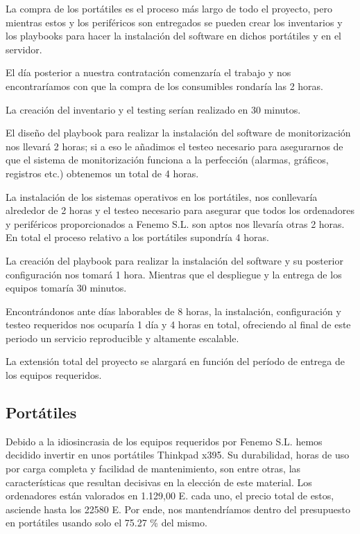 \documentclass[11pt]{article}
\begin{document}
La compra de los portátiles es el proceso más largo de todo el proyecto, pero mientras estos y los periféricos son entregados se pueden crear los inventarios y los playbooks para hacer la instalación del software en dichos portátiles y en el servidor.

El día posterior a nuestra contratación comenzaría el trabajo y nos encontraríamos con que la compra de los consumibles rondaría las 2 horas.

La creación del inventario y el testing serían realizado en 30 minutos.

El diseño del playbook para realizar la instalación del software de monitorización nos llevará 2 horas; si a eso le añadimos el testeo necesario para asegurarnos de que el sistema de monitorización funciona a la perfección (alarmas, gráficos, registros etc.) obtenemos un total de 4 horas.

La instalación de los sistemas operativos en los portátiles, nos conllevaría alrededor de 2 horas y el testeo necesario para asegurar que todos los ordenadores y periféricos proporcionados a Fenemo S.L. son aptos nos llevaría otras 2 horas. En total el proceso relativo a los portátiles supondría 4 horas.

La creación del playbook para realizar la instalación del software y su posterior configuración nos tomará 1 hora. Mientras que el despliegue y la entrega de los equipos tomaría 30 minutos.

Encontrándonos ante días laborables de 8 horas, la instalación, configuración y testeo requeridos nos ocuparía 1 día y 4 horas en total, ofreciendo al final de este periodo un servicio reproducible y altamente escalable.

La extensión total del proyecto se alargará en función del período de entrega de los equipos requeridos.

\subsection{Portátiles}
\label{sec:orgad66ca6}

Debido a la idiosincrasia de los equipos requeridos por Fenemo S.L. hemos decidido invertir en unos portátiles Thinkpad x395. Su durabilidad, horas de uso por carga completa y facilidad de mantenimiento, son entre otras, las características que resultan decisivas en la elección de este material. Los ordenadores están valorados en 1.129,00 E. cada uno, el precio total de estos, asciende hasta los 22580 E. Por ende, nos mantendríamos dentro del presupuesto en portátiles usando solo el 75.27 \% del mismo.
\end{document}

